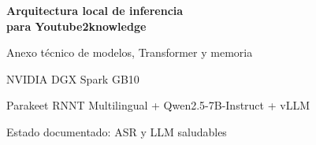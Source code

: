 \documentclass[11pt,a4paper]{article}
\begin{document}
\begin{titlepage}
  \color{YTwoInk}
  \vspace*{28mm}
  {\sffamily\bfseries\fontsize{29}{34}\selectfont
    Arquitectura local de inferencia\\[3mm]
    para Youtube2knowledge\par}
  \vspace{10mm}
  {\sffamily\Large Anexo técnico de modelos, Transformer y memoria\par}
  \vspace{18mm}
  \vfill
  {\sffamily\large NVIDIA DGX Spark GB10\par}
  {\sffamily\color{YTwoMuted}
    Parakeet RNNT Multilingual + Qwen2.5-7B-Instruct + vLLM\par}
  \vspace{8mm}
  {\sffamily\color{YTwoMuted}Estado documentado: ASR y LLM saludables\par}
\end{titlepage}


\end{document}
